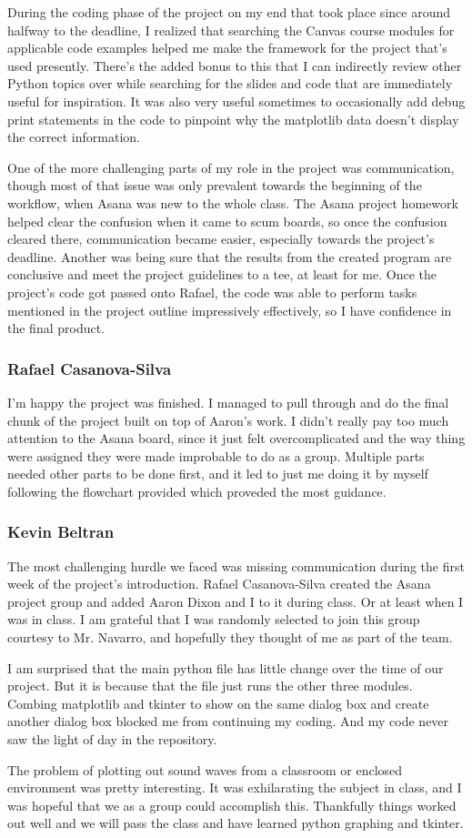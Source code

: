 \documentclass[11pt]{article}
\begin{document}
During the coding phase of the project on my end that took place since around halfway to the deadline, I realized that searching the Canvas course modules for applicable code examples helped me make the framework for the project that’s used presently. There’s the added bonus to this that I can indirectly review other Python topics over while searching for the slides and code that are immediately useful for inspiration. It was also very useful sometimes to occasionally add debug print statements in the code to pinpoint why the matplotlib data doesn’t display the correct information.

One of the more challenging parts of my role in the project was communication, though most of that issue was only prevalent towards the beginning of the workflow, when Asana was new to the whole class. The Asana project homework helped clear the confusion when it came to scum boards, so once the confusion cleared there, communication became easier, especially towards the project’s deadline. Another was being sure that the results from the created program are conclusive and meet the project guidelines to a tee, at least for me. Once the project’s code got passed onto Rafael, the code was able to perform tasks mentioned in the project outline impressively effectively, so I have confidence in the final product. 
\subsubsection{Rafael Casanova-Silva}
I'm happy the project was finished. I managed to pull through and do the final chunk of the project built on top of Aaron's work. I didn't really pay too much attention to the
Asana board, since it just felt overcomplicated and the way thing were assigned they were made improbable to do as a group. Multiple parts needed other parts to be done first, and
it led to just me doing it by myself following the flowchart provided which proveded the most guidance.
\subsubsection{Kevin Beltran}

The most challenging hurdle we faced was missing communication during the first week of the project's introduction. Rafael Casanova-Silva created the Asana project group and added Aaron Dixon and I to it during class. Or at least when I was in class. I am grateful that I was randomly selected to join this group courtesy to Mr. Navarro, and hopefully they thought of me as part of the team.  

I am surprised that the main python file has little change over the time of our project. But it is because that the file just runs the other three modules. Combing matplotlib and tkinter to show on the same dialog box and create another dialog box blocked me from continuing my coding. And my code never saw the light of day in the repository. 

The problem of plotting out sound waves from a classroom or enclosed environment was pretty interesting. It was exhilarating the subject in class, and I was hopeful that we as a group could accomplish this. Thankfully things worked out well and we will pass the class and have learned python graphing and tkinter. 
\end{document}
